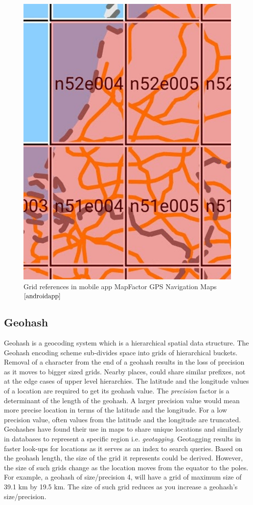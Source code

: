 \begin{figure}
\includegraphics[scale=.25]{appgridsz.jpeg}
\caption{Grid references in mobile app MapFactor GPS Navigation Maps $\cite{androidapp}$}
\label{fg:appgrid}
\end{figure}
\subsection{Geohash} \label{geohash}
Geohash \cite{suwardi2015geohash} is a geocoding system which is a hierarchical spatial data structure. The Geohash encoding scheme sub-divides space into grids of hierarchical buckets. Removal of a character from the end of a geohash results in the loss of precision as it moves to bigger sized grids. Nearby places, could share similar prefixes, not at the edge cases of upper level hierarchies. The latitude and the longitude values of a location are required to get its geohash value. The \textit{precision} factor is a determinant of the length of the geohash. A larger precision value would mean more precise location in terms of the latitude and the longitude. For a low precision value, often values from the latitude and the longitude are truncated. Geohashes have found their use in maps to share unique locations and similarly in databases to represent a specific region i.e. \textit{geotagging}. Geotagging results in faster look-ups for locations as it serves as an index to search queries. Based on the geohash length, the size of the grid it represents could be derived. However, the size of such grids change as the location moves from the equator to the poles. For example, a geohash of size/precision 4, will have a grid of maximum size of 39.1 km by 19.5 km. The size of such grid reduces as you increase a geohash's size/precision. 

